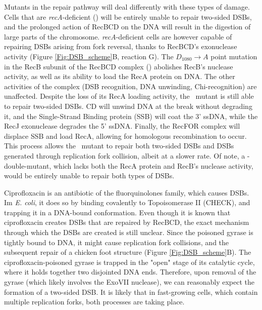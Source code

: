 Mutants in the repair pathway will deal differently with these types of damage. Cells that are \emph{recA}-deficient (\dreca) will be entirely unable to repair two-sided DSBs, and the prolonged action of RecBCD on the DNA will result in the digestion of large parts of the chromosome. \emph{recA}-deficient cells are however capable of repairing DSBs arising from fork reversal, thanks to RecBCD's exonuclease activity (Figure \ref{Fig:DSB_scheme}B, reaction G). The $D_{1080} \rightarrow A$ point mutation in the RecB subunit of the RecBCD complex (\teneighty) abolishes RecB's nuclease activity, as well as its ability to load the RecA protein on DNA. The other activities of the complex (DSB recognition, DNA unwinding, Chi-recognition) are unaffected. Despite the loss of its RecA loading activity, the \teneighty\ mutant is still able to repair two-sided DSBs. \teneighty CD will unwind DNA at the break without degrading it, and the Single-Strand Binding protein (SSB) will coat the 3' ssDNA, while the RecJ exonuclease degrades the 5' ssDNA. Finally, the RecFOR complex will displace SSB and load RecA, allowing for homologous recombination to occur. This process allows the \teneighty\ mutant to repair both two-sided DSBs and DSBs generated through replication fork collision, albeit at a slower rate. Of note, a \dreca-\teneighty double-mutant, which lacks both the RecA protein and RecB's nuclease activity, would be entirely unable to repair both types of DSBs.

Ciprofloxacin is an antibiotic of the fluor\-quinolones family, which causes DSBs. Im \emph{E. coli}, it does so by binding covalently to Topoisomerase II (CHECK), and trapping it in a DNA-bound conformation. Even though it is known that ciprofloxacin creates DSBs that are repaired by RecBCD, the exact mechanism through which the DSBs are created is still unclear. Since the poisoned gyrase is tightly bound to DNA, it might cause replication fork collisions, and the subsequent repair of a chicken foot structure (Figure \ref{Fig:DSB_scheme}B). The ciprofloxacin-poisoned gyrase is trapped in the "open" stage of its catalytic cycle, where it holds together two disjointed DNA ends. Therefore, upon removal of the gyrase (which likely involves the ExoVII nuclease), we can reasonably expect the formation of a two-sided DSB. It is likely that in fast-growing cells, which contain multiple replication forks, both processes are taking place.

